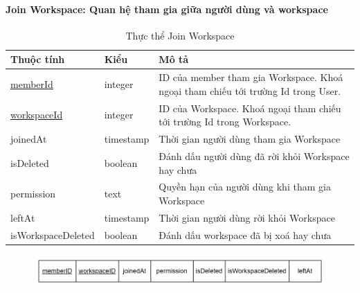 \paragraph{Join Workspace: Quan hệ tham gia giữa người dùng và workspace}
\begin{center}
\begin{table}[!h]
        \begin{tabular}{ |p{3cm} |p{2cm} |p{9cm} |} 
                \hline
                   Thuộc tính & Kiểu & Mô tả \\ [0.5ex] 
                \hline
                \underline{memberId} & integer & ID của member tham gia Workspace. Khoá ngoại tham chiếu tới trường Id trong User. \\ 
                \hline
                \underline{workspaceId} & integer & ID của Workspace. Khoá ngoại tham chiếu tới trường Id trong Workspace. \\
                \hline
                joinedAt & timestamp & Thời gian người dùng tham gia Workspace \\
                \hline
                isDeleted & boolean & Đánh dấu người dùng đã rời khỏi Workspace hay chưa \\
                \hline
                permission & text & Quyền hạn của người dùng khi tham gia Workspace \\
                \hline
                leftAt & timestamp & Thời gian người dùng rời khỏi Workspace \\
                \hline
                isWorkspaceDeleted & boolean & Đánh dấu workspace đã bị xoá hay chưa \\
                \hline
               \end{tabular}
                        \caption{Thực thể Join Workspace}
\end{table}
\end{center}
\begin{figure}[H]
        \centering
        \includegraphics[width=\textwidth]{Content/Phân tích và thiết kế hệ thống/images/ERD_mapping/joinWorkspace_mapping.png}
        \label{fig:Thực thể Join Workspace}
\end{figure}


